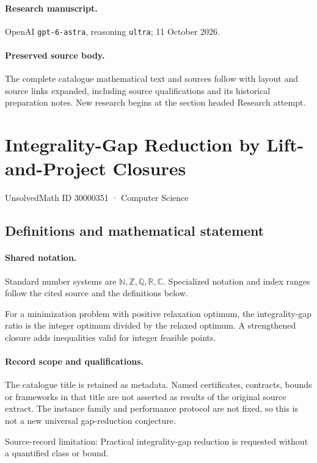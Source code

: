 \documentclass[11pt]{article}
\begin{document}
\paragraph{Research manuscript.} OpenAI \texttt{gpt-6-astra}, reasoning \texttt{ultra}; 11 October 2026.
\paragraph{Preserved source body.} The complete catalogue mathematical text and sources follow with layout and source links expanded, including source qualifications and its historical preparation notes. New research begins at the section headed Research attempt.

\section{Integrality-Gap Reduction by Lift-and-Project Closures}\label{30000351}
{\small UnsolvedMath ID 30000351 · Computer Science}
\subsection{Definitions and mathematical statement}

\paragraph{Shared notation.}Standard number systems are $\mathbb N,\mathbb Z,\mathbb Q,\mathbb R,\mathbb C$. Specialized notation and index ranges follow the cited source and the definitions below.


For a minimization problem with positive relaxation optimum, the integrality-gap ratio is the integer optimum divided by the relaxed optimum. A strengthened closure adds inequalities valid for integer feasible points.
\paragraph{Record scope and qualifications.}
The catalogue title is retained as metadata. Named certificates, contracts, bounds or frameworks in that title are not asserted as results of the original source extract.
The instance family and performance protocol are not fixed, so this is not a new universal gap-reduction conjecture.

Source-record limitation: Practical integrality-gap reduction is requested without a quantified class or bound.
\end{document}
